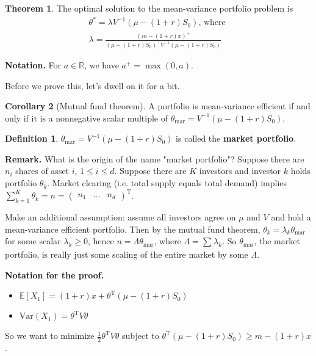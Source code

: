 \documentclass{article}
\theoremstyle{definition}
\newtheorem{theorem}{Theorem}[section]
\newtheorem{cor}[theorem]{Corollary}
\newtheorem{defn}{Definition}[section]
\begin{document}
\begin{theorem}
    The optimal solution to the mean-variance portfolio problem is
    \begin{align*}
        \theta^* = \lambda V^{-1}(\mu-(1+r)S_0) \text{,   where } \\
        \lambda = \frac{(m-(1+r)x)^{+}}{(\mu-(1+r)S_0)^\top V^{-1} (\mu-(1+r)S_0)}
    \end{align*}
\end{theorem}
\textbf{Notation.} For $a \in \mathbb{R}$, we have $a^+ = \max(0,a)$.


Before we prove this, let's dwell on it for a bit.

\begin{cor}[Mutual fund theorem]
    A portfolio is mean-variance efficient if and only if it is a nonnegative scalar multiple of $\theta_{\text{mar}} = V^{-1}(\mu - (1+r)S_0)$.
\end{cor}
\begin{defn}
    $\theta_{\text{mar}} = V^{-1}(\mu - (1+r)S_0)$ is called the \textbf{market portfolio}.
\end{defn}

\textbf{Remark.} What is the origin of the name "market portfolio"? Suppose there are $n_i$ shares of asset $i$, $1 \le i \le d$. Suppose there are $K$ investors and investor $k$ holds portfolio $\theta_k$. Market clearing (i.e. total supply equals total demand) implies $\sum_{k=1}^{K} \theta_k = n = \begin{pmatrix} n_1 & \ldots & n_d \end{pmatrix}^{\text{T}}$.

Make an additional assumption: assume all investors agree on $\mu$ and $V$ and hold a mean-variance efficient portfolio. Then by the mutual fund theorem, $\theta_k = \lambda_k \theta_{\text{mar}}$ for some scalar $\lambda_k \ge 0$, hence $n = \Lambda \theta_{\text{mar}}$, where $\Lambda = \sum_{}^{} \lambda_k$. So $\theta_{\text{mar}}$, the market portfolio, is really just some scaling of the entire market by some $\Lambda$.

\newpage
\textbf{Notation for the proof.}
\begin{itemize}
    \item $\mathbb{E}[X_1] = (1+r)x + \theta^{\text{T}}(\mu-(1+r)S_0)$
    \item $\text{Var}(X_1) = \theta^{\text{T}} V \theta$
\end{itemize}
So we want to minimize $\frac{1}{2} \theta^{\text{T}} V \theta$ subject to $\theta^{\text{T}}(\mu - (1+r)S_0) \ge m - (1+r)x$.
\end{document}
